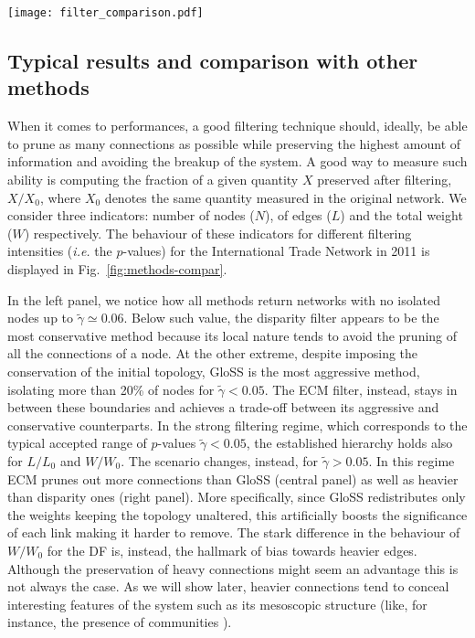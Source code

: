 \documentclass[aps,twocolumn,superscriptaddress]{revtex4-1}
\newcommand{\ie}{\emph{i.e.} }
\newcommand{\gloss}{GloSS }
\begin{document}
%
\begin{figure*}[t]
\centering
%
\texttt{[image: filter\_comparison.pdf]}
%
\caption{Effects of filtering on three topological indicators, for the International Trade Network in 2011: fraction of nodes ${N}/{N_0}$ (left), links ${L}/{L_0}$ (center), and total weight ${W}/{W_0}$ (right) as a function of the $p$-value $\widetilde{\gamma}$. Red dots refer to the disparity filter, blue to GloSS, and green to ECM.} 
\label{fig:methods-compar}
\end{figure*}
%
\subsection{Typical results and comparison with other methods}
When it comes to performances, a good filtering technique should, ideally, be able to prune as many connections as possible while preserving the highest amount of information and avoiding the breakup of the system. A good way to measure such ability is computing the fraction of a given quantity $X$ preserved after filtering, ${X}/{X_0}$, where $X_0$ denotes the same quantity measured in the original network. We consider three indicators: number of nodes ($N$), of edges ($L$) and the total weight ($W$) respectively. The behaviour of these indicators for different filtering intensities (\ie the $p$-values) for the International Trade Network in 2011 is displayed in Fig.~\ref{fig:methods-compar}.

In the left panel, we notice how all methods return networks with no isolated nodes up to $\widetilde{\gamma} \simeq 0.06$. Below such value, the disparity filter appears to be the most conservative method because its local nature tends to avoid the pruning of all the connections of a node. 
At the other extreme, despite imposing the conservation of the initial topology, GloSS is the most aggressive method, isolating more than 20\% of nodes for $\widetilde{\gamma} < 0.05$. 
The ECM filter, instead, stays in between these boundaries and achieves a trade-off between its aggressive and conservative counterparts. In the strong filtering regime, which corresponds to the typical accepted range of $p$-values $\widetilde{\gamma} < 0.05$, the established hierarchy holds also for ${L}/{L_0}$ and ${W}/{W_0}$. The scenario changes, instead, for $\widetilde{\gamma} > 0.05$. In this regime ECM prunes out more connections than \gloss (central panel) as well as heavier than disparity ones (right panel). More specifically, since \gloss redistributes only the weights keeping the topology unaltered, this artificially boosts the significance of each link making it harder to remove. The stark difference in the behaviour of ${W}/{W_0}$ for the DF is, instead, the hallmark of bias towards heavier edges. Although the preservation of heavy connections might seem an advantage this is not always the case. As we will show later, heavier connections tend to conceal interesting features of the system such as its mesoscopic structure (like, for instance, the presence of communities \cite{fortunato-phys_rep-2010, liebig-epl-2016}).
\end{document}
